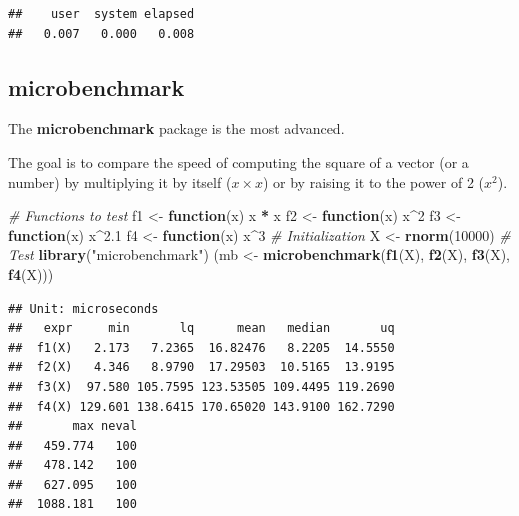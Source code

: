 \documentclass[
  12pt,
  american,
  a4paper,
  extrafontsizes,onecolumn,openright
  ]{memoir}
\newenvironment{Shaded}{\begin{snugshade}}{\end{snugshade}}
\newcommand{\CommentTok}[1]{\textcolor[rgb]{0.56,0.35,0.01}{\textit{#1}}}
\newcommand{\ControlFlowTok}[1]{\textcolor[rgb]{0.13,0.29,0.53}{\textbf{#1}}}
\newcommand{\DecValTok}[1]{\textcolor[rgb]{0.00,0.00,0.81}{#1}}
\newcommand{\FloatTok}[1]{\textcolor[rgb]{0.00,0.00,0.81}{#1}}
\newcommand{\FunctionTok}[1]{\textcolor[rgb]{0.13,0.29,0.53}{\textbf{#1}}}
\newcommand{\NormalTok}[1]{#1}
\newcommand{\OtherTok}[1]{\textcolor[rgb]{0.56,0.35,0.01}{#1}}
\newcommand{\SpecialCharTok}[1]{\textcolor[rgb]{0.81,0.36,0.00}{\textbf{#1}}}
\newcommand{\StringTok}[1]{\textcolor[rgb]{0.31,0.60,0.02}{#1}}
\begin{document}
\begin{verbatim}
##    user  system elapsed 
##   0.007   0.000   0.008
\end{verbatim}

\normalsize

\subsection{microbenchmark}\label{microbenchmark}

The \textbf{microbenchmark} package is the most advanced.

The goal is to compare the speed of computing the square of a vector (or a number) by multiplying it by itself (\(x \times x\)) or by raising it to the power of 2 (\(x^2\)).

\scriptsize

\begin{Shaded}
\begin{Highlighting}[]
\CommentTok{\# Functions to test}
\NormalTok{f1 }\OtherTok{\textless{}{-}} \ControlFlowTok{function}\NormalTok{(x) x }\SpecialCharTok{*}\NormalTok{ x}
\NormalTok{f2 }\OtherTok{\textless{}{-}} \ControlFlowTok{function}\NormalTok{(x) x}\SpecialCharTok{\^{}}\DecValTok{2}
\NormalTok{f3 }\OtherTok{\textless{}{-}} \ControlFlowTok{function}\NormalTok{(x) x}\SpecialCharTok{\^{}}\FloatTok{2.1}
\NormalTok{f4 }\OtherTok{\textless{}{-}} \ControlFlowTok{function}\NormalTok{(x) x}\SpecialCharTok{\^{}}\DecValTok{3}
\CommentTok{\# Initialization}
\NormalTok{X }\OtherTok{\textless{}{-}} \FunctionTok{rnorm}\NormalTok{(}\DecValTok{10000}\NormalTok{)}
\CommentTok{\# Test}
\FunctionTok{library}\NormalTok{(}\StringTok{"microbenchmark"}\NormalTok{)}
\NormalTok{(mb }\OtherTok{\textless{}{-}} \FunctionTok{microbenchmark}\NormalTok{(}\FunctionTok{f1}\NormalTok{(X), }\FunctionTok{f2}\NormalTok{(X), }\FunctionTok{f3}\NormalTok{(X), }\FunctionTok{f4}\NormalTok{(X)))}
\end{Highlighting}
\end{Shaded}

\begin{verbatim}
## Unit: microseconds
##   expr     min       lq      mean   median       uq
##  f1(X)   2.173   7.2365  16.82476   8.2205  14.5550
##  f2(X)   4.346   8.9790  17.29503  10.5165  13.9195
##  f3(X)  97.580 105.7595 123.53505 109.4495 119.2690
##  f4(X) 129.601 138.6415 170.65020 143.9100 162.7290
##       max neval
##   459.774   100
##   478.142   100
##   627.095   100
##  1088.181   100
\end{verbatim}
\end{document}
